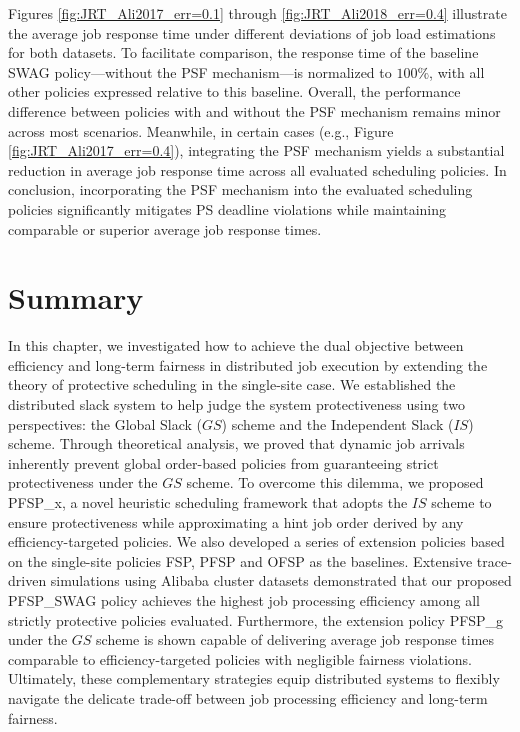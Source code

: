 Figures \ref{fig:JRT_Ali2017_err=0.1} through \ref{fig:JRT_Ali2018_err=0.4} illustrate the average job response time under different deviations of job load estimations for both datasets. To facilitate comparison, the response time of the baseline SWAG policy—without the PSF mechanism—is normalized to $100\%$, with all other policies expressed relative to this baseline. Overall, the performance difference between policies with and without the PSF mechanism remains minor across most scenarios. Meanwhile, in certain cases (e.g., Figure \ref{fig:JRT_Ali2017_err=0.4}), integrating the PSF mechanism yields a substantial reduction in average job response time across all evaluated scheduling policies. In conclusion, incorporating the PSF mechanism into the evaluated scheduling policies significantly mitigates PS deadline violations while maintaining comparable or superior average job response times. 


\section{Summary}
\label{sec:conclusion3}

In this chapter, we investigated how to achieve the dual objective between efficiency and long-term fairness in distributed job execution by extending the theory of protective scheduling in the single-site case. We established the distributed slack system to help judge the system protectiveness using two perspectives: the Global Slack ($GS$) scheme and the Independent Slack ($IS$) scheme. Through theoretical analysis, we proved that dynamic job arrivals inherently prevent global order-based policies from guaranteeing strict protectiveness under the $GS$ scheme. To overcome this dilemma, we proposed PFSP\_x, a novel heuristic scheduling framework that adopts the $IS$ scheme to ensure protectiveness while approximating a hint job order derived by any efficiency-targeted policies. We also developed a series of extension policies based on the single-site policies FSP, PFSP and OFSP as the baselines. Extensive trace-driven simulations using Alibaba cluster datasets demonstrated that our proposed PFSP\_SWAG policy achieves the highest job processing efficiency among all strictly protective policies evaluated. Furthermore, the extension policy PFSP\_g under the $GS$ scheme is shown capable of delivering average job response times comparable to efficiency-targeted policies with negligible fairness violations. Ultimately, these complementary strategies equip distributed systems to flexibly navigate the delicate trade-off between job processing efficiency and long-term fairness.
